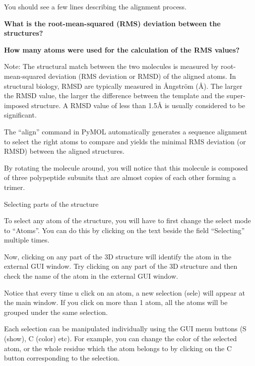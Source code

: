 \documentclass[en,black,12pt,normal]{elegantnote}
\begin{document}
You should see a few lines describing the alignment process.

\textbf{What is the root-mean-squared (RMS) deviation between the structures?}


\textbf{How many atoms were used for the calculation of the RMS values?}

Note: The structural match between the two molecules is measured by root-mean-squared deviation (RMS deviation or RMSD) of the aligned atoms. In structural biology, RMSD are typically measured in Ångström (Å). The larger the RMSD value, the larger the difference between the template and the super-imposed structure. A RMSD value of less than 1.5Å is usually considered to be significant.

The “align” command in PyMOL automatically generates a sequence alignment to select the right atoms to compare and yields the minimal RMS deviation (or RMSD) between the aligned structures.

By rotating the molecule around, you will notice that this molecule is composed of three polypeptide subunits that are almost copies of each other forming a trimer.

Selecting parts of the structure

To select any atom of the structure, you will have to first change the select mode to “Atoms”. You can do this by clicking on the text beside the field “Selecting” multiple times.

Now, clicking on any part of the 3D structure will identify the atom in the external GUI window. Try clicking on any part of the 3D structure and then check the name of the atom in the external GUI window.

Notice that every time u click on an atom, a new selection (sele) will appear at the main window. If you click on more than 1 atom, all the atoms will be grouped under the same selection.

Each selection can be manipulated individually using the GUI menu buttons (S (show), C (color) etc). For example, you can change the color of the selected atom, or the whole residue which the atom belongs to by clicking on the C button corresponding to the selection.




{}
\end{document}
